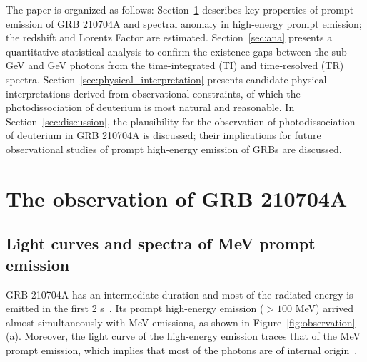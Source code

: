 \documentclass[linenumbers,twocolumn]{aastex631}
\begin{document}
The paper is organized as follows: Section~\ref{sec:obs} describes key properties of prompt emission of GRB 210704A and spectral anomaly in high-energy prompt emission; the redshift and Lorentz Factor are estimated. Section~\ref{sec:ana} presents a quantitative statistical analysis to confirm the existence gaps between the sub GeV and GeV photons from the time-integrated (TI) and time-resolved (TR) spectra. Section~\ref{sec:physical_interpretation} presents candidate physical interpretations derived from observational constraints, of which the photodissociation of deuterium is most natural and reasonable.
In Section~\ref{sec:discussion}, the plausibility for the observation of photodissociation of deuterium in GRB 210704A is discussed; their implications for future observational studies of prompt high-energy emission of GRBs are discussed.



\section{The observation of GRB 210704A}\label{sec:obs}

\subsection{Light curves and spectra of MeV prompt emission}\label{sec:obs.1}

GRB 210704A has an intermediate duration and most of the radiated energy is emitted in the first 2 s~\citep{2021GCN.30380....1M,2023MNRAS.522.5204B}. Its prompt high-energy emission ($>100$ MeV) arrived almost simultaneously with MeV emissions, as shown in Figure~\ref{fig:observation} (a).  Moreover, the light curve of the high-energy emission traces that of the MeV prompt emission, which implies that most of the photons are of internal
origin~\citep{2011MNRAS.415...77M,2012MNRAS.420..468P}.%
\end{document}
